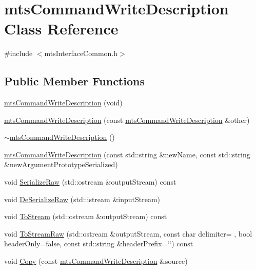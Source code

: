 \hypertarget{classmts_command_write_description}{}\section{mts\+Command\+Write\+Description Class Reference}
\label{classmts_command_write_description}


{\ttfamily \#include $<$mts\+Interface\+Common.\+h$>$}

\subsection*{Public Member Functions}
\begin{DoxyCompactItemize}
\item 
\hyperlink{classmts_command_write_description_a1c47077ea57d5477dedd5994e56e81f1}{mts\+Command\+Write\+Description} (void)
\item 
\hyperlink{classmts_command_write_description_a6f45670abee5e88f2e48f07d4d22bf8a}{mts\+Command\+Write\+Description} (const \hyperlink{classmts_command_write_description}{mts\+Command\+Write\+Description} \&other)
\item 
\hyperlink{classmts_command_write_description_a67177c3a65d4908c5e9bd1ff0062f89f}{$\sim$mts\+Command\+Write\+Description} ()
\item 
\hyperlink{classmts_command_write_description_a7643bfcafa111c7ea6a5c01a65a7ced2}{mts\+Command\+Write\+Description} (const std\+::string \&new\+Name, const std\+::string \&new\+Argument\+Prototype\+Serialized)
\item 
void \hyperlink{classmts_command_write_description_a52754ff0cc1d5f4b790099f52e1046a2}{Serialize\+Raw} (std\+::ostream \&output\+Stream) const 
\item 
void \hyperlink{classmts_command_write_description_a3f8691fdc29b0950f1ee39f204b36e0e}{De\+Serialize\+Raw} (std\+::istream \&input\+Stream)
\item 
void \hyperlink{classmts_command_write_description_a6f74c9163daeb410a5beb5bd450aa0ce}{To\+Stream} (std\+::ostream \&output\+Stream) const 
\item 
void \hyperlink{classmts_command_write_description_ada69d284215c92bae33ca9baa42f7398}{To\+Stream\+Raw} (std\+::ostream \&output\+Stream, const char delimiter= \textquotesingle{} \textquotesingle{}, bool header\+Only=false, const std\+::string \&header\+Prefix=\char`\"{}\char`\"{}) const 
\item 
void \hyperlink{classmts_command_write_description_abc658ed697b820ccf691dee2fe067cc7}{Copy} (const \hyperlink{classmts_command_write_description}{mts\+Command\+Write\+Description} \&source)

\end{DoxyCompactItemize}
